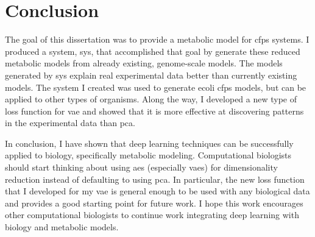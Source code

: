 \chapter{Conclusion}
The goal of this dissertation was to provide a metabolic model for \gls{cfps} systems.
I produced a system, \gls{sys}, that accomplished that goal by generate these reduced metabolic models from already existing, genome-scale models.
The models generated by \gls{sys} explain real experimental data better than currently existing models.
The system I created was used to generate \gls{ecoli} \gls{cfps} models, but can be applied to other types of organisms.
Along the way, I developed a new type of loss function for \gls{vae} and showed that it is more effective at discovering patterns in the experimental data than \gls{pca}.

In conclusion, I have shown that deep learning techniques can be successfully applied to biology, specifically metabolic modeling.
Computational biologists should start thinking about using \glspl{ae} (especially \glspl{vae}) for dimensionality reduction instead of defaulting to using \gls{pca}.
In particular, the new loss function that I developed for my \gls{vae} is general enough to be used with any biological data and provides a good starting point for future work.
I hope this work encourages other computational biologists to continue work integrating deep learning with biology and metabolic models.